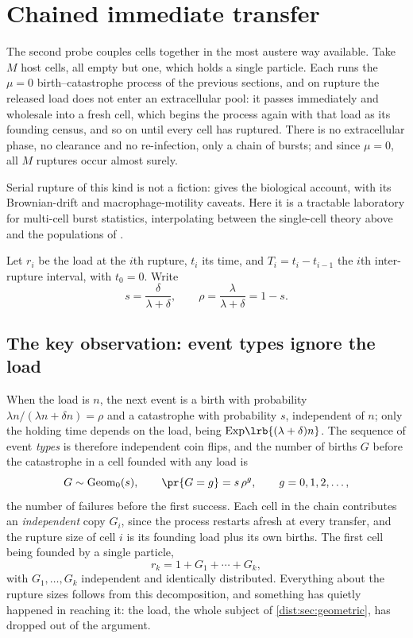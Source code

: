 \section{Chained immediate transfer}
\label{dist:sec:chained}

The second probe couples cells together in the most austere way available.
Take $M$ host cells, all empty but one, which holds a single particle. Each
runs the $\mu=0$ birth--catastrophe process of the previous sections, and on
rupture the released load does not enter an extracellular pool: it passes
immediately and wholesale into a fresh cell, which begins the process again
with that load as its founding census, and so on until every cell has
ruptured. There is no extracellular phase, no clearance and no re-infection,
only a chain of bursts; and since $\mu=0$, all $M$ ruptures occur almost
surely.

Serial rupture of this kind is not a fiction:
 gives the
biological account, with its Brownian-drift and macrophage-motility caveats.
Here it is a tractable laboratory for multi-cell burst statistics,
interpolating between the single-cell theory above and the populations of \ChPop.

Let $r_i$ be the load at the $i$th rupture, $t_i$ its time, and
$T_i=t_i-t_{i-1}$ the $i$th inter-rupture interval, with $t_0=0$. Write
\begin{equation}
s=\frac{\delta}{\lambda+\delta},
\qquad
\rho=\frac{\lambda}{\lambda+\delta}=1-s.
\label{dist:eq:srho}
\end{equation}

\subsection{The key observation: event types ignore the load}
\label{dist:sec:key-observation}

When the load is $n$, the next event is a birth with probability
$\lambda n/(\lambda n+\delta n)=\rho$ and a catastrophe with probability $s$,
independent of $n$; only the holding time depends on the load, being
$\mathrm{Exp}\lrb{(\lambda+\delta)n}$. The sequence of event \emph{types} is
therefore independent coin flips, and the number of births $G$ before the
catastrophe in a cell founded with any load is
\begin{equation}
G\sim\mathrm{Geom}_0(s),
\qquad
\pr{G=g}=s\,\rho^g,\qquad g=0,1,2,\ldots,
\label{dist:eq:geomevents}
\end{equation}
the number of failures before the first success. Each cell in the chain
contributes an \emph{independent} copy $G_i$, since the process restarts
afresh at every transfer, and the rupture size of cell $i$ is its founding
load plus its own births. The first cell being founded by a single particle,
\begin{equation}
r_k = 1 + G_1 + \cdots + G_k,
\label{dist:eq:rkdecomp}
\end{equation}
with $G_1,\ldots,G_k$ independent and identically distributed. Everything
about the rupture sizes follows from this decomposition, and something has
quietly happened in reaching it: the load, the whole subject of
\cref{dist:sec:geometric}, has dropped out of the argument.

